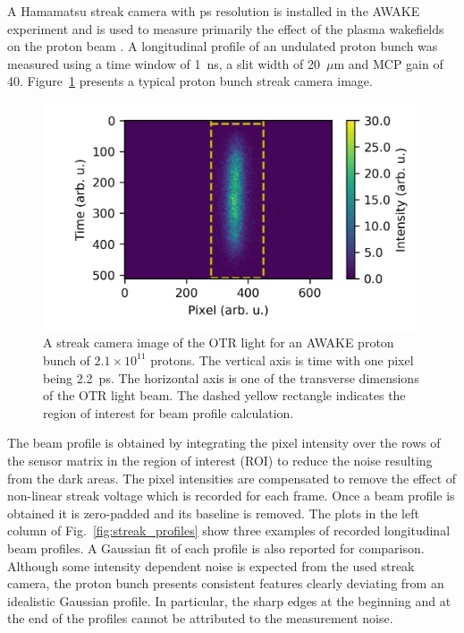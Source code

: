 A Hamamatsu streak camera with ps resolution \cite{hama_streak} is installed in the AWAKE experiment and is used to measure primarily the effect of the plasma wakefields on the proton beam \cite{PhysRevLett.122.054802, Bachmann_streak}. A longitudinal profile of an undulated proton bunch was measured using a time window of 1~ns, a slit width of 20~$\mu\text{m}$ and MCP gain of 40. Figure~\ref{fig:streak_image} presents a typical proton bunch streak camera image. 
\begin{figure}[!t]
\centering
\includegraphics[scale=1.15, keepaspectratio]{pictures/streak_image_thesis}
\caption{A streak camera image of the OTR light for an AWAKE proton bunch of $2.1\times10^{11}$ protons. The vertical axis is time with one pixel being 2.2~ps. The horizontal axis is one of the transverse dimensions of the OTR light beam. The dashed yellow rectangle indicates the region of interest for beam profile calculation.}
\label{fig:streak_image}
\end{figure}
The beam profile is obtained by integrating the pixel intensity over the rows of the sensor matrix in the region of interest (ROI) to reduce the noise resulting from the dark areas. The pixel intensities are compensated to remove the effect of non-linear streak voltage which is recorded for each frame. Once a beam profile is obtained it is zero-padded and its baseline is removed. The plots in the left column of Fig.~\ref{fig:streak_profiles} show three examples of recorded longitudinal beam profiles. A Gaussian fit of each profile is also reported for comparison. Although some intensity dependent noise is expected from the used streak camera, the proton bunch presents consistent features clearly deviating from an idealistic Gaussian profile. In particular, the sharp edges at the beginning and at the end of the profiles cannot be attributed to the measurement noise.

